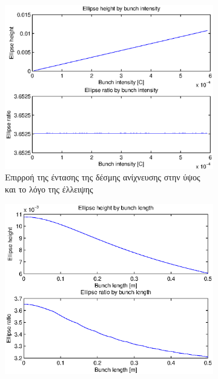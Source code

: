 \begin{figure}[tph]	
	\begin{subfigure}{0.47\textwidth}
		\includegraphics[width=\linewidth]{figures/beam-deflection-script-03-elipse-height}
		\centering
		\caption{Επιρροή της έντασης της δέσμης ανίχνευσης στην ύψος και το λόγο της έλλειψης}
		\label{fig:beam-deflection-script-03-elipse-height}
	\end{subfigure}
	\hfill
	\begin{subfigure}{0.47\textwidth}
		\includegraphics[width=\linewidth]{figures/beam-deflection-script-04-elipse-height-by-bunch-intensity}

\end{subfigure}
\end{figure}

